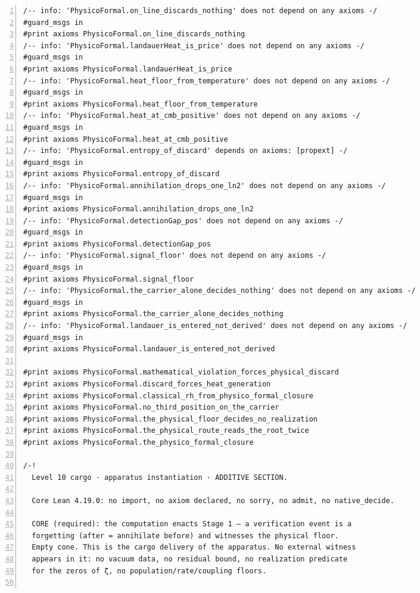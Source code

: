 \documentclass[10pt]{article}
\newcommand{\leansize}{\fontsize{5.5pt}{6.75pt}\selectfont}
\begin{document}
\begin{multicols}{2}
\begin{Verbatim}[numbers=left,firstnumber=1,numbersep=3pt,xleftmargin=2.6em,breaklines=true,breakanywhere=true,breakautoindent=false,breakindent=1.4em,breaksymbolleft={},breakanywheresymbolpre={},fontsize=\leansize]
/-- info: 'PhysicoFormal.on_line_discards_nothing' does not depend on any axioms -/
#guard_msgs in
#print axioms PhysicoFormal.on_line_discards_nothing
/-- info: 'PhysicoFormal.landauerHeat_is_price' does not depend on any axioms -/
#guard_msgs in
#print axioms PhysicoFormal.landauerHeat_is_price
/-- info: 'PhysicoFormal.heat_floor_from_temperature' does not depend on any axioms -/
#guard_msgs in
#print axioms PhysicoFormal.heat_floor_from_temperature
/-- info: 'PhysicoFormal.heat_at_cmb_positive' does not depend on any axioms -/
#guard_msgs in
#print axioms PhysicoFormal.heat_at_cmb_positive
/-- info: 'PhysicoFormal.entropy_of_discard' depends on axioms: [propext] -/
#guard_msgs in
#print axioms PhysicoFormal.entropy_of_discard
/-- info: 'PhysicoFormal.annihilation_drops_one_ln2' does not depend on any axioms -/
#guard_msgs in
#print axioms PhysicoFormal.annihilation_drops_one_ln2
/-- info: 'PhysicoFormal.detectionGap_pos' does not depend on any axioms -/
#guard_msgs in
#print axioms PhysicoFormal.detectionGap_pos
/-- info: 'PhysicoFormal.signal_floor' does not depend on any axioms -/
#guard_msgs in
#print axioms PhysicoFormal.signal_floor
/-- info: 'PhysicoFormal.the_carrier_alone_decides_nothing' does not depend on any axioms -/
#guard_msgs in
#print axioms PhysicoFormal.the_carrier_alone_decides_nothing
/-- info: 'PhysicoFormal.landauer_is_entered_not_derived' does not depend on any axioms -/
#guard_msgs in
#print axioms PhysicoFormal.landauer_is_entered_not_derived

#print axioms PhysicoFormal.mathematical_violation_forces_physical_discard
#print axioms PhysicoFormal.discard_forces_heat_generation
#print axioms PhysicoFormal.classical_rh_from_physico_formal_closure
#print axioms PhysicoFormal.no_third_position_on_the_carrier
#print axioms PhysicoFormal.the_physical_floor_decides_no_realization
#print axioms PhysicoFormal.the_physical_route_reads_the_root_twice
#print axioms PhysicoFormal.the_physico_formal_closure

/-!
  Level 10 cargo · apparatus instantiation · ADDITIVE SECTION.

  Core Lean 4.19.0: no import, no axiom declared, no sorry, no admit, no native_decide.

  CORE (required): the computation enacts Stage 1 — a verification event is a
  forgetting (after = annihilate before) and witnesses the physical floor.
  Empty cone. This is the cargo delivery of the apparatus. No external witness
  appears in it: no vacuum data, no residual bound, no realization predicate
  for the zeros of ζ, no population/rate/coupling floors.


\end{Verbatim}
\end{multicols}
\end{document}
